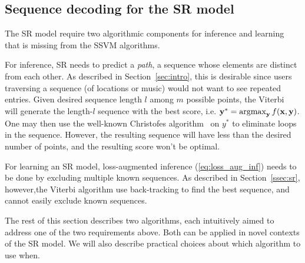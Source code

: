 
\subsection{Sequence decoding for the SR model}
\label{ssec:subtour}

The SR model require two algorithmic components for inference and learning that is missing from the SSVM algorithms. 

For inference, SR needs to predict a {\em path}, \ie a sequence whose elements are distinct from each other. 
As described in Section~\ref{sec:intro}, this is desirable since users traversing a sequence (of locations or music)
would not want to see repeated entries. 
Given desired sequence length $l$ among $m$ possible points, the Viterbi~\cite{tsochantaridis2005large} 
will generate the length-$l$ sequence with the best score, i.e. $\mathbf{y}^* = \operatorname*{argmax}_{\mathbf{y}} f(\mathbf{x},\mathbf{y})$. 
One may then use the well-known 
Christofes algorithm~\cite{christofides1976} on $y^*$ to eliminate loops in the sequence. 
However, the resulting sequence will have less than the desired number of points, and the resulting score won't be optimal. 

For learning an SR model, loss-augmented inference (\ref{eq:loss_aug_inf}) needs to be done by excluding multiple known sequences. 
As described in Section~\ref{ssec:sr}, %
however,the Viterbi algorithm use back-tracking to find the best sequence, 
and cannot easily exclude known sequences. 


The rest of this section describes two algorithms, each intuitively aimed to address one of the two requirements above. 
Both can be applied in novel contexts of the SR model. 
We will also describe practical choices about which algorithm to use when. 


